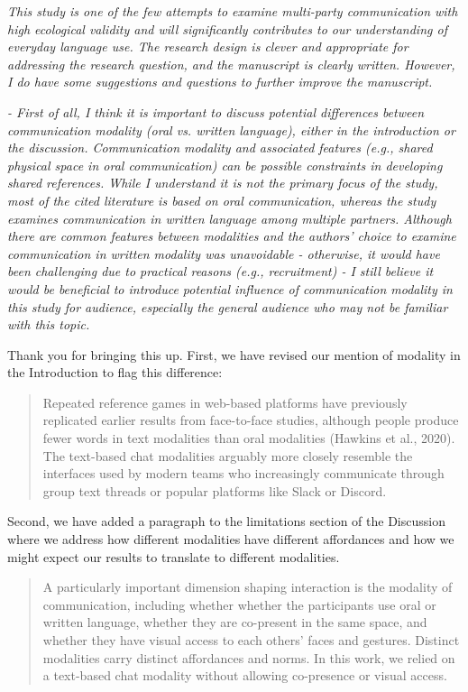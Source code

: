 \documentclass{stanfordletter}
\newcommand{\theysaid}[1]{\begin{leftbar} \noindent 
		\textsl{ #1}\end{leftbar}}
\newcommand{\revised}[1]{\begin{quote}	#1 \end{quote}}
\begin{document}
\begin{letter}{}
          \theysaid{This study is one of the few attempts to examine multi-party communication with high ecological validity and will significantly contributes to our understanding of everyday language use. The research design is clever and appropriate for addressing the research question, and the manuscript is clearly written. However, I do have some suggestions and questions to further improve the manuscript.}
          
          \theysaid{- First of all, I think it is important to discuss potential differences between communication modality (oral vs. written language), either in the introduction or the discussion. Communication modality and associated features (e.g., shared physical space in oral communication) can be possible constraints in developing shared references. While I understand it is not the primary focus of the study, most of the cited literature is based on oral communication, whereas the study examines communication in written language among multiple partners. Although there are common features between modalities and the authors' choice to examine communication in written modality was unavoidable - otherwise, it would have been challenging due to practical reasons (e.g., recruitment) - I still believe it would be beneficial to introduce potential influence of communication modality in this study for audience, especially the general audience who may not be familiar with this topic.}

		Thank you for bringing this up. First, we have revised our mention of modality in the Introduction to flag this difference:
          
          \revised{Repeated reference games in web-based platforms have previously replicated earlier results from face-to-face studies, although people produce fewer words in text modalities than oral modalities (Hawkins et al., 2020). The text-based chat modalities arguably more closely resemble the interfaces used by modern teams who increasingly communicate through group text threads or popular platforms like Slack or Discord.}
          
Second, we have added a paragraph to the limitations section of the Discussion where we address how different modalities have different affordances and how we might expect our results to translate to different modalities. 

          \revised{A particularly important dimension shaping interaction is the modality of communication, including whether whether the participants use oral or written language, whether they are co-present in the same space, and whether they have visual access to each others' faces and gestures.
          	Distinct modalities carry distinct affordances and norms.
          	In this work, we relied on a text-based chat modality without allowing co-presence or visual access.
          	
}
\end{letter}
\end{document}
